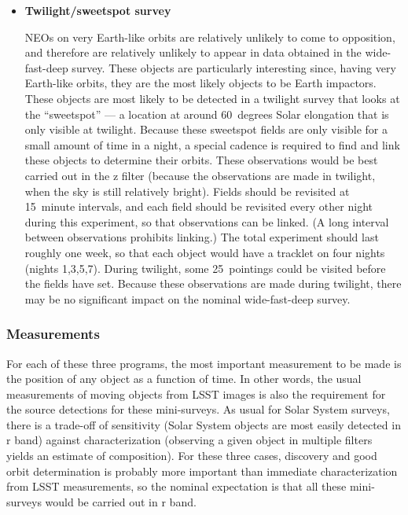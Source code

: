 \begin{itemize}
\item{{\bf Twilight/sweetspot survey}}

NEOs on very Earth-like orbits are relatively
unlikely to come to opposition, and therefore
are relatively unlikely to appear in data
obtained in the wide-fast-deep survey.
These objects are particularly interesting
since, having very Earth-like orbits, they
are the most likely objects to be Earth
impactors.
These objects are most likely to be detected
in a twilight survey that looks at the ``sweetspot'' ---
a location at around 60~degrees Solar
elongation that is only visible at twilight.
Because these sweetspot fields are only visible
for a small amount of time in a night, a special
cadence is required to find and link these objects
to determine their orbits.
These observations would be best carried out
in the z filter (because the observations are
made in twilight, when the sky is still relatively
bright). Fields should be revisited at 15~minute
intervals, and each field should be revisited
every other night during this experiment, so that
observations can be linked.
(A long interval
between observations prohibits linking.)
The total experiment
should last roughly one week, so that each
object would have a tracklet on four nights
(nights 1,3,5,7).
During twilight, some 25~pointings could be visited
before the fields have set.
Because these observations are made during twilight,
there may be no significant impact on the
nominal wide-fast-deep survey.
\end{itemize}

\subsubsection{Measurements}

For each of these three programs, the most important measurement
to be made is the position of any object as a function of time.
In other words, the usual measurements of moving
objects from LSST images is also the requirement for
the source detections for these mini-surveys. As usual
for Solar System surveys, there is a trade-off of
sensitivity (Solar System objects are most easily
detected in r band) against characterization (observing
a given object in multiple filters yields an estimate
of composition). For these three cases, discovery and
good orbit determination is probably more important than
immediate characterization from LSST measurements,
so the nominal expectation is that all these mini-surveys
would be carried out in r band.


